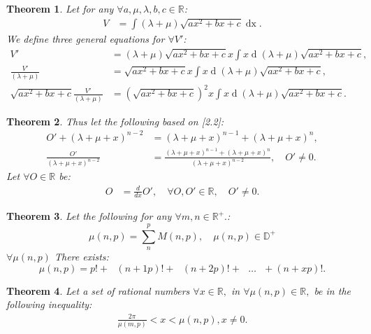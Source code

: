 \documentclass[10pt]{article}
\theoremstyle{plain}
\newtheorem{theorem}{Theorem}[section]
\theoremstyle{definition}
\theoremstyle{remark}
\begin{document}
\begin{theorem}
	Let for any $\forall a, \mu, \lambda, b, c \in \mathbb{R}$:
	\begin{align*}
		V &= \int (\lambda + \mu)\sqrt{ax^2 + bx  +c} \operatorname{dx}.
	\end{align*}
	We define three general equations for $\forall V'$:
	\begin{align*}
		V' &= (\lambda + \mu)\sqrt{ax^2 + bx  +c}x \int x \operatorname{d}(\lambda + \mu)\sqrt{ax^2 + bx  +c},\\
		\frac{V'}{(\lambda + \mu)} &= \sqrt{ax^2 + bx  +c}x \int x \operatorname{d}(\lambda + \mu)\sqrt{ax^2 + bx  +c},\\
		\sqrt{ax^2 + bx  +c}\frac{V'}{(\lambda + \mu)} &= (\sqrt{ax^2 + bx  +c})^{2}x \int x \operatorname{d}(\lambda + \mu)\sqrt{ax^2 + bx  +c}.
	\end{align*}
\end{theorem}

\begin{theorem}
	Thus let the following based on [2.2]:
	\begin{align*}
		O' + (\lambda + \mu + x)^{n-2} &= (\lambda + \mu + x)^{n-1} + (\lambda + \mu + x)^{n},\\
		\frac{O'}{(\lambda + \mu + x)^{n-2}} &= \frac{(\lambda + \mu + x)^{n-1} + (\lambda + \mu + x)^{n}}{(\lambda + \mu + x)^{n-2}}, \quad O' \neq 0.
	\end{align*}
	Let $\forall O \in \mathbb{R}$ be:
	\begin{align*}
		O &= \frac{d}{dx} O', \quad \forall O, O' \in \mathbb{R}, \quad O' \neq 0.
	\end{align*}
\end{theorem}

\begin{theorem}
	Let the following for any $\forall m, n \in \mathbb{R}^{+}.$:
\begin{equation}
    \mu(n, p) = \sum_{n}^{p} M(n, p), \quad \mu(n, p) \in \mathbb{D}^{+}
\end{equation}
$\forall \mu(n, p)$ There exists:
\begin{equation}
    \mu(n, p) = p! + \text{ } (n+1p)! + \text{ } (n+2p)! + \text{ } \dots \text{ } + (n+xp)!.
\end{equation}
\end{theorem}

\begin{theorem}
	Let a set of rational numbers $\forall x \in \mathbb{R},$ in $\forall \mu(n, p) \in \mathbb{R},$ be in the following inequality:
	\begin{align*}
		\frac{2\pi}{\mu(m, p)} < x < \mu(n, p), x \neq 0.
	\end{align*}
\end{theorem}
\end{document}
